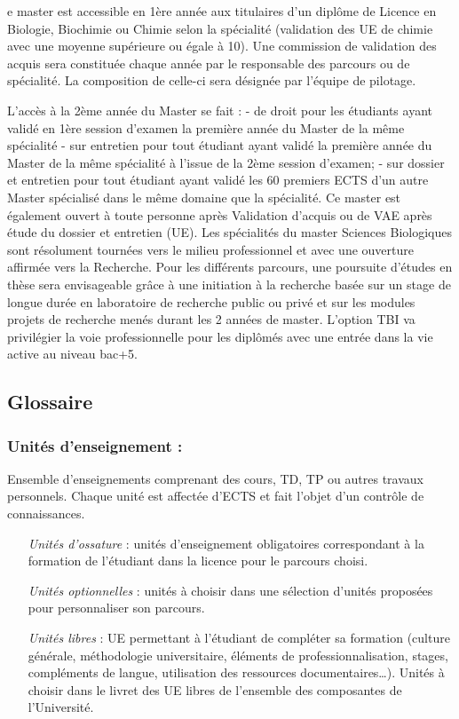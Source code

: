 \documentclass[10pt, a5paper]{report}
\begin{document}
\begin{spacing}{1.5}
e master est accessible en 1ère année aux titulaires d’un diplôme de Licence en Biologie,  Biochimie ou Chimie selon la spécialité (validation des UE de chimie avec une moyenne supérieure ou égale à 10).
Une commission de validation des acquis sera constituée chaque année par le responsable des parcours ou de spécialité. La composition de celle-ci sera désignée par l’équipe de pilotage.

L’accès à la 2ème année du Master se fait :
- de droit pour les étudiants ayant validé en 1ère session d'examen la première année du Master de la même spécialité
- sur entretien pour tout étudiant ayant validé la première année du Master de la même spécialité à l'issue de la 2ème session d'examen;
- sur dossier et entretien pour tout étudiant ayant validé les 60 premiers ECTS d'un autre Master spécialisé dans le même domaine que la spécialité.
Ce master est également ouvert à toute personne après Validation d’acquis ou de VAE après étude du dossier et entretien (UE).
Les spécialités du master Sciences Biologiques sont résolument tournées vers le milieu professionnel et avec une ouverture affirmée vers la Recherche. Pour les différents parcours, une poursuite d’études en thèse sera envisageable grâce à une initiation à la recherche basée sur un stage de longue durée en laboratoire de recherche public ou privé et sur les modules projets de recherche menés durant les 2 années de master. 
L’option TBI va privilégier la voie professionnelle pour les diplômés avec une entrée dans la vie active au niveau bac+5.  

\subsection*{Glossaire}

\subsubsection*{Unités d’enseignement :} 

Ensemble d’enseignements comprenant des cours, TD, TP ou autres travaux personnels. Chaque unité est affectée d’ECTS et fait l’objet d’un contrôle de connaissances.
\begin{itemize}
\item[\textit{Unités d’ossature}] : unités d’enseignement obligatoires correspondant à la formation de l’étudiant dans la licence  pour le parcours choisi.
\item[\textit{Unités optionnelles}] : unités à choisir dans une sélection d’unités proposées pour personnaliser son parcours.
\item[\textit{Unités libres}] : UE permettant à l’étudiant de compléter sa formation (culture générale, méthodologie universitaire, éléments de professionnalisation, stages, compléments de langue, utilisation des ressources documentaires…). Unités à choisir dans le livret des UE libres de l’ensemble des composantes de l’Université.
\end{itemize}


\end{spacing}
\end{document}
